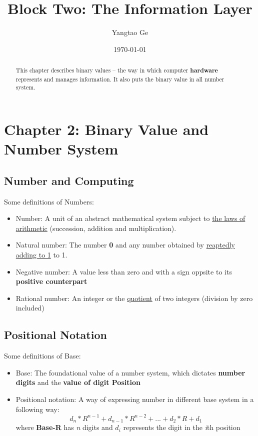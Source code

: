 \documentclass[12pt]{article}
\title{Block Two: The Information Layer}
\author{Yangtao Ge}
\date{\today}
\begin{document}
\maketitle

\section{Chapter 2: Binary Value and Number System}
\begin{abstract}
This chapter describes binary values -- the way in which computer \textbf{hardware} represents and manages information.
It also puts the binary value in all number system.
\end{abstract}

\subsection{Number and  Computing}
Some definitions of Numbers:
\begin{itemize}
    \item Number: A unit of an abstract mathematical system subject to \underline{the laws of arithmetic} (succession, addition and multiplication).
    \item Natural number: The number \textbf{0} and any number obtained by \underline{reaptedly adding to 1} to 1.
    \item Negative number: A value less than zero and with a sign oppsite to its \textbf{positive counterpart}
    \item Rational number: An integer or the \underline{quotient} of two integers (division by zero included)
\end{itemize}

\subsection{Positional Notation}
Some definitions of Base:
\begin{itemize}
    \item Base: The foundational value of a number system, which dictates \textbf{number digits} and the \textbf{value of digit Position}
    \item Positional notation: A way of expressing number in different base system in a following way:
    \begin{equation}
        d_n * R^{n-1} + d_{n-1} * R^{n-2} + ... + d_2 * R + d_1
    \end{equation}
    where \textbf{Base-R} has \textit{n} digits and $d_i$ represents
    the digit in the \textit{i}th position
\end{itemize}
\end{document}
